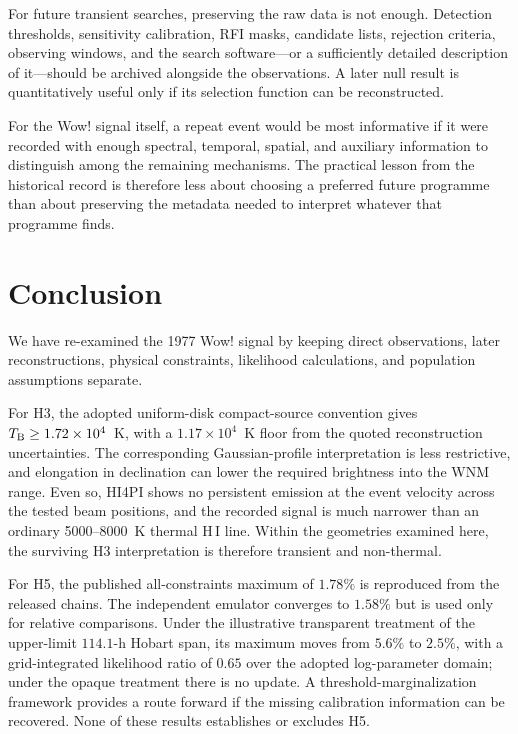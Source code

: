 \documentclass[crop]{CSL}
\newcommand{\tbeq}{T_{\rm B}}
\begin{document}
For future transient searches, preserving the raw data is not enough. Detection thresholds, sensitivity calibration, RFI masks, candidate lists, rejection criteria, observing windows, and the search software---or a sufficiently detailed description of it---should be archived alongside the observations. A later null result is quantitatively useful only if its selection function can be reconstructed.

For the Wow! signal itself, a repeat event would be most informative if it were recorded with enough spectral, temporal, spatial, and auxiliary information to distinguish among the remaining mechanisms. The practical lesson from the historical record is therefore less about choosing a preferred future programme than about preserving the metadata needed to interpret whatever that programme finds.


\section{Conclusion}
\label{sec:conclusion}

We have re-examined the 1977 Wow! signal by keeping direct observations, later reconstructions, physical constraints, likelihood calculations, and population assumptions separate.

For H3, the adopted uniform-disk compact-source convention gives $\tbeq\geq1.72\times10^4$~K, with a $1.17\times10^4$~K floor from the quoted reconstruction uncertainties. The corresponding Gaussian-profile interpretation is less restrictive, and elongation in declination can lower the required brightness into the WNM range. Even so, HI4PI shows no persistent emission at the event velocity across the tested beam positions, and the recorded signal is much narrower than an ordinary 5000--8000~K thermal H\,I line. Within the geometries examined here, the surviving H3 interpretation is therefore transient and non-thermal.

For H5, the published all-constraints maximum of $1.78\%$ is reproduced from the released chains. The independent emulator converges to $1.58\%$ but is used only for relative comparisons. Under the illustrative transparent treatment of the upper-limit $114.1$-h Hobart span, its maximum moves from $5.6\%$ to $2.5\%$, with a grid-integrated likelihood ratio of $0.65$ over the adopted log-parameter domain; under the opaque treatment there is no update. A threshold-marginalization framework provides a route forward if the missing calibration information can be recovered. None of these results establishes or excludes H5.
\end{document}
